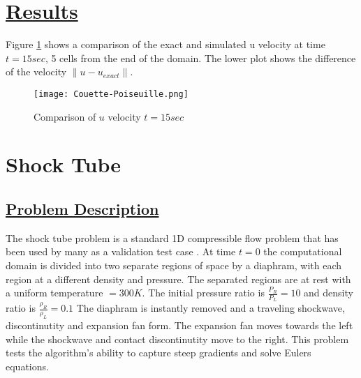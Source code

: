 \section*{\underline{Results}}
Figure \ref{fig:Poiseuille} shows a comparison of the exact and simulated u
velocity at time $t = 15sec$, 5 cells from the end of the domain.  The lower
plot shows the difference of the velocity $\|u - u_{exact}\|$.
%
\begin{figure}
  \texttt{[image: Couette-Poiseuille.png]}
  \caption{ Comparison of $u$ velocity $t = 15sec$}
  \label{fig:Poiseuille}
  \end{figure}
\newpage
%
\section*{\center Shock Tube}
\subsection*{\underline{Problem Description}}
The shock tube problem is a standard 1D compressible flow problem that
has been used by many as a validation test case \cite{ref:laney, ref:sod, ref:toro}.
At time $t=0$ the computational domain is divided into two separate regions of
space by a diaphram, with each region at a different density and pressure.
The separated regions are at rest with a uniform temperature $=300K$.
The initial pressure ratio is $\frac{P_R}{P_L}  = 10$ and density ratio
is $\frac{\rho_R}{\rho_L} = 0.1$  The diaphram is instantly removed and a
traveling shockwave, discontinutity and expansion fan form.  The expansion
fan moves towards the left while the shockwave and contact discontinutity
move to the right.  This problem tests the algorithm's ability to capture
steep gradients and solve Eulers equations.
%
